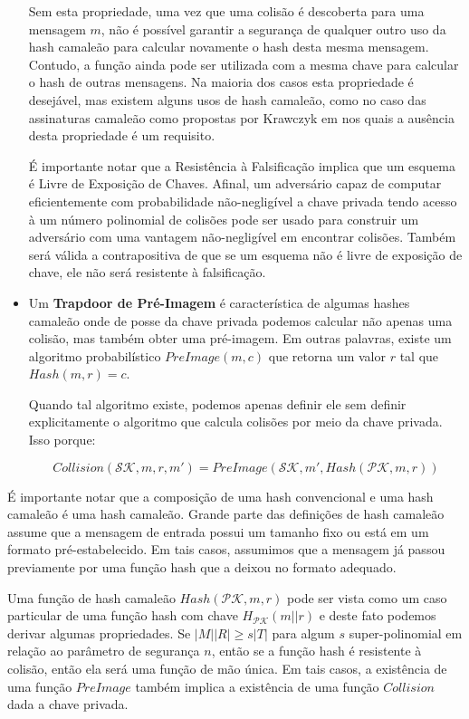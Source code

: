 \documentclass[a4paper]{article}
\begin{document}
\begin{itemize}
  Sem esta propriedade, uma vez que uma colisão é descoberta para uma
  mensagem $m$, não é possível garantir a segurança de qualquer outro
  uso da hash camaleão para calcular novamente o hash desta mesma
  mensagem. Contudo, a função ainda pode ser utilizada com a mesma
  chave para calcular o hash de outras mensagens. Na maioria dos casos
  esta propriedade é desejável, mas existem alguns usos de hash
  camaleão, como no caso das assinaturas camaleão como propostas por
  Krawczyk em \cite{krawczyk} nos quais a ausência desta propriedade é
  um requisito.

  É importante notar que a Resistência à Falsificação implica que um
  esquema é Livre de Exposição de Chaves. Afinal, um adversário capaz
  de computar eficientemente com probabilidade não-negligível a chave
  privada tendo acesso à um número polinomial de colisões pode ser
  usado para construir um adversário com uma vantagem não-negligível
  em encontrar colisões. Também será válida a contrapositiva de que se
  um esquema não é livre de exposição de chave, ele não será
  resistente à falsificação.
\item Um \textbf{Trapdoor de Pré-Imagem} é característica de algumas
  hashes camaleão onde de posse da chave privada podemos calcular não
  apenas uma colisão, mas também obter uma pré-imagem. Em outras
  palavras, existe um algoritmo probabilístico $PreImage(m, c)$ que
  retorna um valor $r$ tal que $Hash(m, r)=c$.

  Quando tal algoritmo existe, podemos apenas definir ele sem definir
  explicitamente o algoritmo que calcula colisões por meio da chave
  privada. Isso porque:

  $$Collision(\mathcal{SK}, m, r, m') = PreImage(\mathcal{SK}, m',
  Hash(\mathcal{PK}, m, r))$$
\end{itemize}

  
É importante notar que a composição de uma hash convencional e uma
hash camaleão é uma hash camaleão. Grande parte das definições de hash
camaleão assume que a mensagem de entrada possui um tamanho fixo ou
está em um formato pré-estabelecido. Em tais casos, assumimos que a
mensagem já passou previamente por uma função hash que a deixou no
formato adequado.

Uma função de hash camaleão $Hash(\mathcal{PK}, m, r)$ pode ser vista
como um caso particular de uma função hash com chave
$H_{\mathcal{PK}}(m||r)$ e deste fato podemos derivar algumas
propriedades. Se $|M||R| \geq s |T|$ para algum $s$ super-polinomial
em relação ao parâmetro de segurança $n$, então se a função hash é
resistente à colisão, então ela será uma função de mão única. Em tais
casos, a existência de uma função $PreImage$ também implica a
existência de uma função $Collision$ dada a chave privada.
\end{document}
